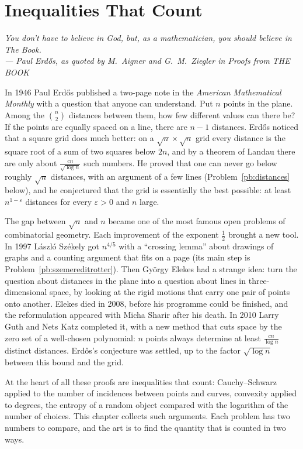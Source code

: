 \chapter{Inequalities That Count}

\begin{center}\itshape
You don't have to believe in God, but, as a mathematician, you should believe in The Book.\\
\upshape --- Paul Erdős, as quoted by M.~Aigner and G.~M.~Ziegler in \emph{Proofs from THE BOOK}
\end{center}

In 1946 Paul Erdős published a two-page note in the \emph{American Mathematical Monthly} with a question that anyone can
understand. Put $n$ points in the plane. Among the $\binom n2$ distances between them, how few different values can there be?
If the points are equally spaced on a line, there are $n-1$ distances. Erdős noticed that a square grid does much better: on a
$\sqrt n\times\sqrt n$ grid every distance is the square root of a sum of two squares below $2n$, and by a theorem of Landau
there are only about $\frac{cn}{\sqrt{\log n}}$ such numbers. He proved that one can never go below roughly $\sqrt n$ distances,
with an argument of a few lines (Problem~\ref{pb:distances} below), and he conjectured that the grid is essentially the best
possible: at least $n^{1-\varepsilon}$ distances for every $\varepsilon>0$ and $n$ large.

The gap between $\sqrt n$ and $n$ became one of the most famous open problems of combinatorial geometry. Each improvement of
the exponent $\frac12$ brought a new tool. In 1997 László Székely got $n^{4/5}$ with a ``crossing lemma'' about drawings of
graphs and a counting argument that fits on a page (its main step is Problem~\ref{pb:szemereditrotter}). Then György Elekes
had a strange idea: turn the question about distances in the plane into a question about lines in three-dimensional space,
by looking at the rigid motions that carry one pair of points onto another. Elekes died in 2008, before his programme could be
finished, and the reformulation appeared with Micha Sharir after his death. In 2010 Larry Guth and Nets Katz completed it,
with a new method that cuts space by the zero set of a well-chosen polynomial: $n$ points always determine at least
$\frac{cn}{\log n}$ distinct distances. Erdős's conjecture was settled, up to the factor $\sqrt{\log n}$ between this bound and
the grid.

At the heart of all these proofs are inequalities that count: Cauchy--Schwarz applied to the number of incidences between
points and curves, convexity applied to degrees, the entropy of a random object compared with the logarithm of the number of
choices. This chapter collects such arguments. Each problem has two numbers to compare, and the art is to find the quantity
that is counted in two ways.

